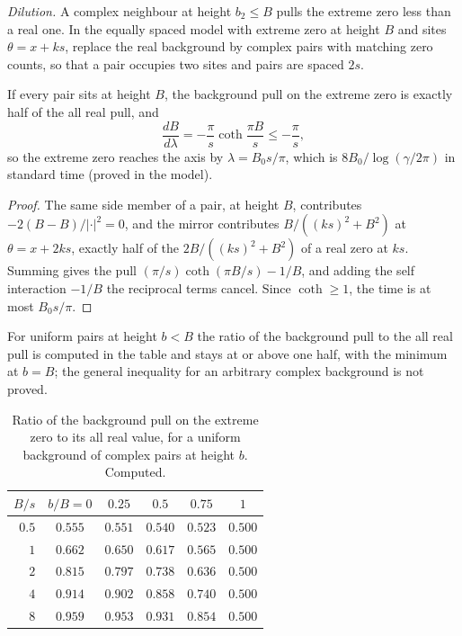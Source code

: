 \emph{Dilution.} A complex neighbour at height $b_2\le B$ pulls the extreme zero less than a real one. In the equally spaced model with extreme zero at height $B$ and sites $\theta=x+ks$, replace the real background by complex pairs with matching zero counts, so that a pair occupies two sites and pairs are spaced $2s$.

\begin{proposition}\label{xi:prop:dilution}
If every pair sits at height $B$, the background pull on the extreme zero is exactly half of the all real pull, and
\[
\frac{dB}{d\lambda}=-\frac\pi s\coth\frac{\pi B}s\le-\frac\pi s ,
\]
so the extreme zero reaches the axis by $\lambda=B_0s/\pi$, which is $8B_0/\log(\gamma/2\pi)$ in standard time (proved in the model).
\end{proposition}

\begin{proof}
The same side member of a pair, at height $B$, contributes $-2(B-B)/|\cdot|^2=0$, and the mirror contributes $B/((ks)^2+B^2)$ at $\theta=x+2ks$, exactly half of the $2B/((ks)^2+B^2)$ of a real zero at $ks$. Summing gives the pull $(\pi/s)\coth(\pi B/s)-1/B$, and adding the self interaction $-1/B$ the reciprocal terms cancel. Since $\coth\ge1$, the time is at most $B_0s/\pi$.
\end{proof}

For uniform pairs at height $b<B$ the ratio of the background pull to the all real pull is computed in the table and stays at or above one half, with the minimum at $b=B$; the general inequality for an arbitrary complex background is not proved.

\begin{table}[htbp]
\centering\small
\begin{tabular}{@{}rccccc@{}}
\toprule
$B/s$ & $b/B=0$ & $0.25$ & $0.5$ & $0.75$ & $1$\\
\midrule
$0.5$ & $0.555$ & $0.551$ & $0.540$ & $0.523$ & $0.500$\\
$1$ & $0.662$ & $0.650$ & $0.617$ & $0.565$ & $0.500$\\
$2$ & $0.815$ & $0.797$ & $0.738$ & $0.636$ & $0.500$\\
$4$ & $0.914$ & $0.902$ & $0.858$ & $0.740$ & $0.500$\\
$8$ & $0.959$ & $0.953$ & $0.931$ & $0.854$ & $0.500$\\
\bottomrule
\end{tabular}
\caption{Ratio of the background pull on the extreme zero to its all real value, for a uniform background of complex pairs at height $b$. Computed.}
\label{xi:tab:dilution}
\end{table}

